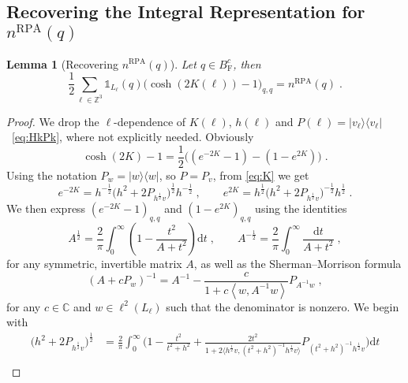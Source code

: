 \documentclass[12pt,a4paper]{article}
\numberwithin{equation}{section}
\newcommand{\1}{\mathbb{I}}
\newcommand{\F}{\mathrm{F}}
\newcommand{\RPA}{\mathrm{RPA}}
\newcommand{\Zstar}{\mathbb{Z}^3} %
\newcommand{\C}{\mathbb{C}}
\newcommand{\Z}{\mathbb{Z}}
\newcommand{\half}{\frac{1}{2}}
\newcommand{\eva}[1]{\left\langle #1 \right\rangle}
\theoremstyle{plain}
\newtheorem{lemma}[theorem]{Lemma}
\theoremstyle{definition}
\theoremstyle{remark}
\theoremstyle{plain}
\theoremstyle{definition}
\theoremstyle{remark}
\begin{document}
\subsection{Recovering the Integral Representation for $ n^{\RPA}(q) $}\label{subsec:integralrep}

\begin{lemma}[Recovering $ n^{\RPA}(q) $] \label{lem:nqb_integralrecovery}
Let $q \in B^c_{\F}$, then
\begin{equation} \label{eq:nqb_integralrecovery}
	\half\sum_{\ell\in \Zstar}\mathds{1}_{L_\ell}(q) \big( \cosh(2K(\ell)) - 1 \big)_{q,q} = n^{\RPA}(q)\;.
\end{equation}
\end{lemma}

\begin{proof}
We drop the $ \ell $-dependence of $K(\ell) $, $ h(\ell) $ and $ P(\ell) = |v_\ell \rangle \langle v_\ell| $~\eqref{eq:HkPk}, where not explicitly needed. Obviously
\begin{equation} \label{eq:coshrewriting}
	\cosh(2K)-1
	= \half\big((e^{-2K}-1)-(1-e^{2K})\big) \;.
\end{equation}
Using the notation $ P_w = |w \rangle \langle w| $, so $ P = P_v $, from \eqref{eq:K} we get
\begin{equation} \label{eq:e-2k}
	e^{-2K} = h^{-\half} \big(h^2 +2P_{h^{\half} v}\big)^{\half} h^{-\half} \;, \qquad
	e^{2K} = h^{\half} \big(h^2 +2P_{h^{\half} v}\big)^{-\half} h^{\half} \;.
\end{equation}
We then express $ (e^{-2K}-1)_{q,q} $ and $ (1-e^{2K})_{q,q} $ using the identities
\begin{equation} \label{eq:intid}
	A^\half = \frac{2}{\pi} \int_0^\infty \left(1- \frac{t^2}{A+t^2}\right) \mathrm{d}t \;,\qquad
	A^{-\half} = \frac{2}{\pi} \int_0^\infty \frac{\mathrm{d}t}{A+t^2} \;,
\end{equation}
for any symmetric, invertible matrix $ A $, as well as the Sherman--Morrison formula
\begin{equation} \label{eq:shermor}
	(A+cP_w)^{-1} = A^{-1} - \frac{c}{1+c\eva{w, A^{-1}w}}P_{A^{-1}w} \;,
\end{equation}
for any $ c \in \C $ and $ w \in \ell^2(L_\ell) $ such that the denominator is nonzero. We begin with 
\begin{align}
	\big(h^2 +2P_{h^{\half} v}\big)^{\half}
	&= \frac{2}{\pi} \int_0^\infty \Bigg( 1- \frac{t^2}{t^2+h^2} + \frac{2 t^2}{1+ 2 \big\langle h^{\half} v ,(t^2+h^2)^{-1} h^\half v \big\rangle } P_{(t^2+h^2)^{-1}h^{\half} v} \Bigg) \mathrm{d}t \nonumber\\

\end{align}
\end{proof}
\end{document}
